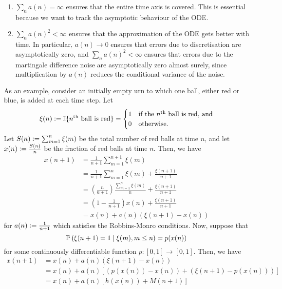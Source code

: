 \begin{enumerate}
    \item $\sum_n a(n) = \infty$ ensures that the entire time axis is covered. This is essential because we want to track the asymptotic behaviour of the ODE. 
    \item $\sum_n a(n)^2 < \infty$ ensures that the approximation of the ODE gets better with time. In particular, $a(n) \to 0$ ensures that errors due to discretisation are asymptotically zero, and $\sum_n a(n)^2 < \infty$ ensures that errors due to the martingale difference noise are asymptotically zero almost surely, since multiplication by $a(n)$ reduces the conditional variance of the noise. 
\end{enumerate}

As an example, consider an initially empty urn to which one ball, either red or blue, is added at each time step. Let 
\[
    \xi(n) \vcentcolon= \I\{n^{\text{th}}\text{ ball is red}\} = \begin{cases}
        1 & \text{if the $n^{\text{th}}$ ball is red, and} \\
        0 & \text{otherwise.}
    \end{cases}
\]  
Let $S(n) \vcentcolon= \sum_{m=1}^n \xi(m)$ be the total number of red balls at time $n$, and let $x(n) \vcentcolon= \frac{S(n)}{n}$ be the fraction of red balls at time $n$. Then, we have
\begin{align*}
    x(n+1) &= \frac{1}{n+1} \sum_{m=1}^{n+1} \xi(m) \\
    &= \frac{1}{n+1} \sum_{m=1}^{n} \xi(m) + \frac{\xi(n+1)}{n+1} \\
    &= \left( \frac{n}{n+1} \right) \frac{\sum_{m=1}^n \xi(m)}{n} + \frac{\xi(n+1)}{n+1} \\
    &= \left( 1 - \frac{1}{n+1} \right) x(n) + \frac{\xi(n+1)}{n+1} \\
    &= x(n) + a(n) ( \xi(n+1) - x(n))
\end{align*}
for $a(n) \vcentcolon= \frac{1}{n+1}$ which satisfies the Robbins-Monro conditions. Now, suppose that
\[
    \P \left( \xi(n+1) = 1 \mid \xi(m), m \leq n \right) = p(x(n))
\]
for some continuously differentiable function $p \colon [0,1] \to [0,1]$. Then, we have
\begin{align*}
    x(n+1) &= x(n) + a(n) ( \xi(n+1) - x(n)) \\
    &= x(n) + a(n) \left[ (p(x(n)) - x(n)) + (\xi(n+1) - p(x(n)))\right] \\
    &= x(n) + a(n) \left[ h(x(n)) + M(n+1) \right]
\end{align*}
